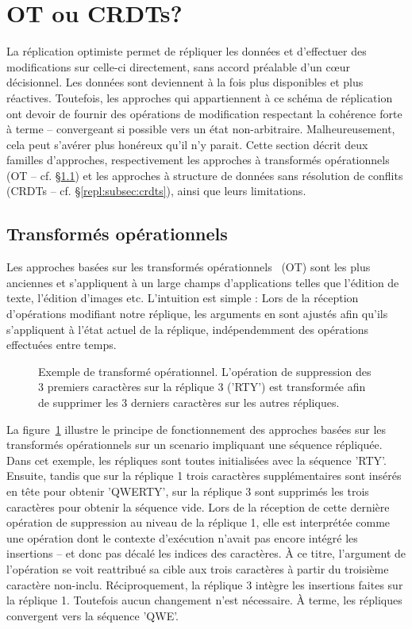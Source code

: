 
\section{OT ou CRDTs?}
\label{repl:sec:otorcrdts}

La réplication optimiste permet de répliquer les données et d'effectuer des
modifications sur celle-ci directement, sans accord préalable d'un cœur
décisionnel. Les données sont deviennent à la fois plus disponibles et plus
réactives. Toutefois, les approches qui appartiennent à ce schéma de réplication
ont devoir de fournir des opérations de modification respectant la cohérence
forte à terme -- convergeant si possible vers un état
non-arbitraire. Malheureusement, cela peut s'avérer plus honéreux qu'il n'y
parait. Cette section décrit deux familles d'approches, respectivement les
approches à transformés opérationnels (OT -- cf. §\ref{repl:subsec:ot}) et les
approches à structure de données sans résolution de conflits (CRDTs --
cf. §\ref{repl:subsec:crdts}), ainsi que leurs limitations.

\subsection{Transformés opérationnels}
\label{repl:subsec:ot}

Les approches basées sur les transformés opérationnels~\cite{sun1998operational,
  sun2009contextbased} (OT) sont les plus anciennes et s'appliquent à un large
champs d'applications telles que l'édition de texte, l'édition d'images
etc. L'intuition est simple : Lors de la réception d'opérations modifiant notre
réplique, les arguments en sont ajustés afin qu'ils s'appliquent à l'état actuel
de la réplique, indépendemment des opérations effectuées entre temps.

\begin{figure}
  \centering
  
  \caption{\label{repl:fig:otexample} Exemple de transformé
    opérationnel. L'opération de suppression des 3 premiers caractères sur la
    réplique 3 ('RTY') est transformée afin de supprimer les 3 derniers caractères
    sur les autres répliques.}
\end{figure}

La figure~\ref{repl:fig:otexample} illustre le principe de fonctionnement des
approches basées sur les transformés opérationnels sur un scenario impliquant
une séquence répliquée. Dans cet exemple, les répliques sont toutes initialisées
avec la séquence 'RTY'. Ensuite, tandis que sur la réplique 1 trois caractères
supplémentaires sont insérés en tête pour obtenir 'QWERTY', sur la réplique 3
sont supprimés les trois caractères pour obtenir la séquence vide. Lors de la
réception de cette dernière opération de suppression au niveau de la réplique 1,
elle est interprétée comme une opération dont le contexte d'exécution n'avait
pas encore intégré les insertions -- et donc pas décalé les indices des
caractères. À ce titre, l'argument de l'opération se voit reattribué sa cible
aux trois caractères à partir du troisième caractère non-inclu. Réciproquement,
la réplique 3 intègre les insertions faites sur la réplique 1. Toutefois aucun
changement n'est nécessaire. À terme, les répliques convergent vers la séquence
'QWE'.

